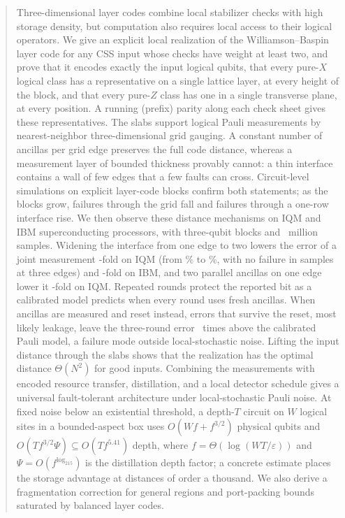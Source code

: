 \begin{abstract}
Three-dimensional layer codes combine local stabilizer checks with high storage
density, but computation also requires local access to their logical operators.
We give an explicit local realization of the Williamson--Baspin layer code for
any CSS input whose checks have weight at least two, and prove that it encodes
exactly the input logical qubits, that every pure-$X$ logical class has a
representative on a single lattice layer, at every height of the block, and
that every pure-$Z$ class has one in a single transverse plane, at every
position.  A running (prefix) parity along each check sheet gives these
representatives.  The slabs support logical Pauli measurements by
nearest-neighbor three-dimensional grid gauging.  A constant number of
ancillas per grid edge preserves the full code distance, whereas a measurement
layer of bounded thickness provably cannot: a thin interface contains a wall
of few edges that a few faults can cross.  Circuit-level simulations on
explicit layer-code blocks confirm both statements; as the blocks grow,
failures through the grid fall and failures through a one-row interface rise.
We then observe these distance mechanisms on IQM and IBM superconducting
processors, with three-qubit blocks and \hwTotalShots~million samples.
Widening the interface from one edge to two lowers the error of a joint
measurement \hwIQMfold-fold on IQM (from \hwIQMwOne\% to \hwIQMwTwo\%, with no
failure in \hwIQMwThreeKept{} samples at three edges) and
\hwIBMfoldOneTwo-fold on IBM, and two parallel ancillas on one edge lower it
\hwMultFold-fold on IQM.  Repeated rounds protect the reported bit as a calibrated
model predicts when every round uses fresh ancillas.  When ancillas are
measured and reset instead, errors that survive the reset, most likely
leakage, leave the three-round error \hwRndIBMModelRatio~times above the
calibrated Pauli model, a failure mode outside local-stochastic noise.
Lifting the input distance through the slabs shows that the realization has
the optimal distance $\Theta(N^2)$ for good inputs.  Combining the
measurements with encoded resource transfer, distillation, and a local
detector schedule gives a universal fault-tolerant architecture under
local-stochastic Pauli noise.  At fixed noise below an existential threshold,
a depth-$T$ circuit on $W$ logical sites in a bounded-aspect box uses
$O(Wf+f^{3/2})$ physical qubits and $O(Tf^{3/2}\Psi)\subseteq O(Tf^{5.41})$
depth, where $f=\Theta(\log(WT/\varepsilon))$ and $\Psi=O(f^{\log_215})$ is
the distillation depth factor; a concrete estimate places the storage
advantage at distances of order a thousand.  We also derive a fragmentation
correction for general regions and port-packing bounds saturated by balanced
layer codes.
\end{abstract}
\maketitle
\raggedbottom

